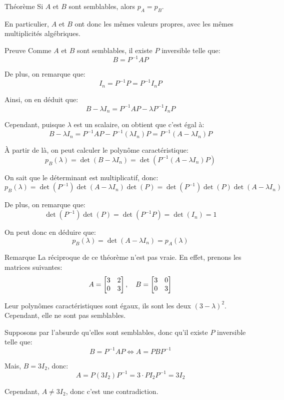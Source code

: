 \documentclass[a4paper]{article}
\begin{document}
\begin{parag}{Théorème}
    Si $A$ et $B$ sont semblables, alors $p_A = p_B$.

    En particulier, $A$ et $B$ ont donc les mêmes valeurs propres, avec les mêmes multiplicités algébriques.

    \begin{subparag}{Preuve}
        Comme $A$ et $B$ sont semblables, il existe $P$ inversible telle que:
        \[B = P^{-1} AP\]
        
        De plus, on remarque que: 
        \[I_n = P^{-1} P = P^{-1} I_n P\]

        Ainsi, on en déduit que: 
        \[B - \lambda I_n = P^{-1} A P - \lambda P^{-1} I_n P\]

        Cependant, puisque $\lambda$ est un scalaire, on obtient que c'est égal à: 
        \[B - \lambda I_n = P^{-1} A P - P^{-1}\left(\lambda I_n\right)P = P^{-1}\left(A - \lambda I_n\right)P\]

        À partir de là, on peut calculer le polynôme caractéristique: 
        \[p_B\left(\lambda\right) = \det\left(B - \lambda I_n\right) = \det\left(P^{-1}\left(A - \lambda I_n\right)P\right)\]

        On sait que le déterminant est multiplicatif, donc:
        \[p_B\left(\lambda\right) = \det\left(P^{-1}\right)\det\left(A - \lambda I_n\right)\det\left(P\right) = \det\left(P^{-1}\right)\det\left(P\right)\det\left(A - \lambda I_n\right)\]
        
        De plus, on remarque que: 
        \[\det\left(P^{-1}\right)\det\left(P\right) = \det\left(P^{-1} P\right) = \det\left(I_n\right) = 1\]

        On peut donc en déduire que:
        \[p_B\left(\lambda\right) = \det\left(A - \lambda I_n\right) = p_A\left(\lambda\right)\]
    \end{subparag}

    \begin{subparag}{Remarque}
        La réciproque de ce théorème n'est pas vraie. En effet, prenons les matrices suivantes: 
        \[A = \begin{bmatrix} 3 & 2 \\ 0 & 3 \end{bmatrix}, \quad B = \begin{bmatrix} 3 & 0 \\ 0 & 3 \end{bmatrix} \]

        Leur polynômes caractéristiques sont égaux, ils sont les deux $\left(3 - \lambda\right)^2$. Cependant, elle ne sont pas semblables. 

        Supposons par l'absurde qu'elles sont semblables, donc qu'il existe $P$ inversible telle que: 
        \[B = P^{-1} A P \iff A = P B P^{-1}\]
        
        Mais, $B = 3 I_2$, donc: 
        \[A = P\left(3I_2\right)P^{-1} = 3\cdot P I_2 P^{-1} = 3I_2\]
        
        Cependant, $A \neq 3I_2$, donc c'est une contradiction.
    \end{subparag}
\end{parag}
\end{document}

